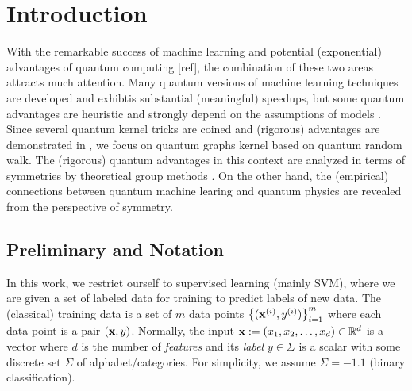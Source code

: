 
\section{Introduction}
With the remarkable success of machine learning and potential (exponential) advantages of quantum computing [ref], the combination of these two areas attracts much attention.
Many quantum versions of machine learning techniques \cite{rebentrostQuantumSupportVector2014} \cite{lloydQuantumPrincipalComponent2014} \cite{congQuantumConvolutionalNeural2019} are developed and exhibtis substantial (meaningful) speedups,
but some quantum advantages are heuristic and strongly depend on the assumptions of models \cite{tangQuantumPrincipalComponent2021}.
Since several quantum kernel tricks are coined \cite{havlicekSupervisedLearningQuantum2019} \cite{schuldQuantumMachineLearning2019} and (rigorous) advantages are demonstrated in \cite{glickCovariantQuantumKernels2021} \cite{liuRigorousRobustQuantum2021},
we focus on quantum graphs kernel based on quantum random walk. 
The (rigorous) quantum advantages in this context are analyzed in terms of symmetries by theoretical group methods \cite{kondorGroupTheoreticalMethods2008} \cite{ben-davidSymmetriesGraphProperties2020}.
On the other hand, the (empirical) connections between quantum machine learing and quantum physics are revealed from the perspective of symmetry.


\subsection{Preliminary and Notation}
In this work, we restrict ourself to supervised learning (mainly SVM), where we are given a set of labeled data for training to predict labels of new data.
The (classical) training data is a set of $m$ data points $\qty{(\vb{x}^{(i)}, y^{(i)})}^{m}_{i=1}$ 
where each data point is a pair $(\vb{x},y)$.
Normally, the input $\vb{x}:= (x_1,x_2,\dots,x_d) \in \mathbb{R}^d$  is a vector where $d$ is the number of \emph{features}
and its \emph{label} $y\in\Sigma$ is a scalar with some discrete set $\Sigma$ of alphabet/categories. 
For simplicity, we assume $\Sigma=\qty{-1,1}$ (binary classification).

